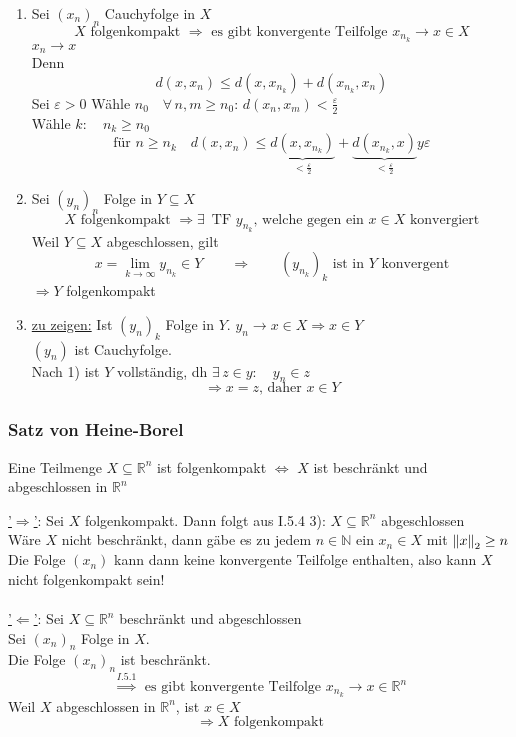 \begin{enumerate}
	\item Sei $(x_n)_n$ Cauchyfolge in $X$
	\[
		X \text{ folgenkompakt } \Rightarrow \text{ es gibt konvergente Teilfolge } x_{n_k} \to x \in X 
	\]
	 $x_n \to x$ \\
	Denn \[
		d(x,x_n) \leq d(x,x_{n_k})+d(x_{n_k},x_n)
	\] Sei $\varepsilon>0$ Wähle $n_0 \quad \forall\, n,m \geq n_0: \, d(x_n,x_m)< \frac{\varepsilon}{2}$ \\
	Wähle $k: \quad n_k \geq n_0 $
	\[
		\text{für } n \geq n_k \quad d(x,x_n) \leq \underset{< \frac{\varepsilon}{2}}{\underbrace{d(x,x_{n_k})}} + 
		\underset{< \frac{\varepsilon}{2}}{\underbrace{d(x_{n_k},x)}} y \varepsilon
	\]
	\item Sei $(y_n)_n$ Folge in $Y \subseteq X$
	\[
		X \text{ folgenkompakt } \Rightarrow \exists\, \text{ TF } y_{n_k} \text{, welche gegen ein $x \in X$ konvergiert}
	\]
	Weil $Y \subseteq X$ abgeschlossen, gilt
	\[
		x = \lim_{k \to \infty}y_{n_k} \in Y \qquad \Rightarrow \qquad (y_{n_k})_k \text{ ist in $Y$ konvergent}
	\]
	$\Rightarrow Y$ folgenkompakt
	\item \underline{zu zeigen:} Ist $(y_n)_k$ Folge in $Y$. $y_n \to x \in X \Rightarrow x \in Y$ \\
	$(y_n)$ ist Cauchyfolge. \\
	 Nach 1) ist $Y$ vollständig, dh $\exists\, z \in y: \quad y_n \in z $
	\[
		\Rightarrow x=z \text{, daher } x \in Y
	\]
\end{enumerate}
\subsubsection{Satz von Heine-Borel} %
\label{ssub:satz}
Eine Teilmenge $X \subseteq \mathbb{R}^n$ ist folgenkompakt $\Leftrightarrow$ $X$ ist beschränkt und abgeschlossen in $\mathbb{R}^n$

\underline{'$\Rightarrow$'}: Sei $X$ folgenkompakt. Dann folgt aus I.5.4 3): $X \subseteq \mathbb{R}^n$ abgeschlossen \\
Wäre $X$ nicht beschränkt, dann gäbe es zu jedem $n \in \mathbb{N}$ ein $x_n \in X$ mit $\norm{x}_2 \geq n$ \\
Die Folge $(x_n)$ kann dann keine konvergente Teilfolge enthalten, also kann $X$ nicht folgenkompakt sein! \\
\\
\underline{'$\Leftarrow$'}: Sei $X \subseteq \mathbb{R}^n$ beschränkt und abgeschlossen \\
Sei $(x_n)_n$  Folge in $X$. \\
Die Folge $(x_n)_n$ ist beschränkt. 
\[
	\stackrel{I.5.1}{\Rightarrow} \text{ es gibt konvergente Teilfolge } x_{n_k} \to x \in \mathbb{R}^n
\]
Weil $X$ abgeschlossen in $\mathbb{R}^n$, ist $x \in X$
\[
	\Rightarrow X \text{ folgenkompakt}
\]
\bewende

